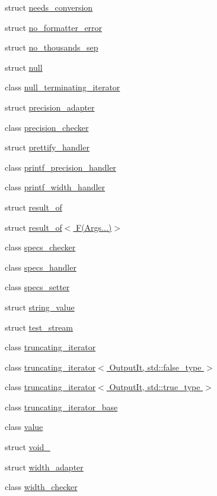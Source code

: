 \begin{DoxyCompactItemize}
\item 
struct \hyperlink{structinternal_1_1needs__conversion}{needs\+\_\+conversion}
\item 
struct \hyperlink{structinternal_1_1no__formatter__error}{no\+\_\+formatter\+\_\+error}
\item 
struct \hyperlink{structinternal_1_1no__thousands__sep}{no\+\_\+thousands\+\_\+sep}
\item 
struct \hyperlink{structinternal_1_1null}{null}
\item 
class \hyperlink{classinternal_1_1null__terminating__iterator}{null\+\_\+terminating\+\_\+iterator}
\item 
struct \hyperlink{structinternal_1_1precision__adapter}{precision\+\_\+adapter}
\item 
class \hyperlink{classinternal_1_1precision__checker}{precision\+\_\+checker}
\item 
struct \hyperlink{structinternal_1_1prettify__handler}{prettify\+\_\+handler}
\item 
class \hyperlink{classinternal_1_1printf__precision__handler}{printf\+\_\+precision\+\_\+handler}
\item 
class \hyperlink{classinternal_1_1printf__width__handler}{printf\+\_\+width\+\_\+handler}
\item 
struct \hyperlink{structinternal_1_1result__of}{result\+\_\+of}
\item 
struct \hyperlink{structinternal_1_1result__of_3_01_f_07_args_8_8_8_08_4}{result\+\_\+of$<$ F(\+Args...)$>$}
\item 
class \hyperlink{classinternal_1_1specs__checker}{specs\+\_\+checker}
\item 
class \hyperlink{classinternal_1_1specs__handler}{specs\+\_\+handler}
\item 
class \hyperlink{classinternal_1_1specs__setter}{specs\+\_\+setter}
\item 
struct \hyperlink{structinternal_1_1string__value}{string\+\_\+value}
\item 
struct \hyperlink{structinternal_1_1test__stream}{test\+\_\+stream}
\item 
class \hyperlink{classinternal_1_1truncating__iterator}{truncating\+\_\+iterator}
\item 
class \hyperlink{classinternal_1_1truncating__iterator_3_01_output_it_00_01std_1_1false__type_01_4}{truncating\+\_\+iterator$<$ Output\+It, std\+::false\+\_\+type $>$}
\item 
class \hyperlink{classinternal_1_1truncating__iterator_3_01_output_it_00_01std_1_1true__type_01_4}{truncating\+\_\+iterator$<$ Output\+It, std\+::true\+\_\+type $>$}
\item 
class \hyperlink{classinternal_1_1truncating__iterator__base}{truncating\+\_\+iterator\+\_\+base}
\item 
class \hyperlink{classinternal_1_1value}{value}
\item 
struct \hyperlink{structinternal_1_1void__}{void\+\_\+}
\item 
struct \hyperlink{structinternal_1_1width__adapter}{width\+\_\+adapter}
\item 
class \hyperlink{classinternal_1_1width__checker}{width\+\_\+checker}
\end{DoxyCompactItemize}
